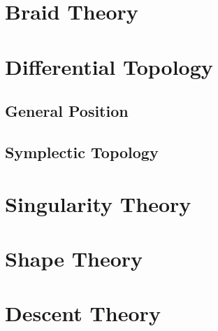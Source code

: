 \section{Braid Theory} \label{sec:braid_theory}

\section{Differential Topology}\label{sec:differential_topology}

\subsection{General Position}\label{sec:general_position}

\subsection{Symplectic Topology}\label{sec:symplectic_topology}



\section{Singularity Theory}\label{sec:singularity_theory}

\section{Shape Theory}\label{sec:shape_theory}

\section{Descent Theory}\label{sec:descent_theory}

